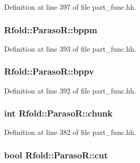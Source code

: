 Definition at line 397 of file part\+\_\+func.\+hh.

\hypertarget{class_rfold_1_1_paraso_r_a0372b87e995aa99226a2e5c0bda44800}{
\subsubsection[{bppm}]{ Rfold\+::\+Paraso\+R\+::bppm}}\label{class_rfold_1_1_paraso_r_a0372b87e995aa99226a2e5c0bda44800}


Definition at line 393 of file part\+\_\+func.\+hh.

\hypertarget{class_rfold_1_1_paraso_r_a34ad7bc233e6711a93c7cb69c8ed9855}{
\subsubsection[{bppv}]{ Rfold\+::\+Paraso\+R\+::bppv}}\label{class_rfold_1_1_paraso_r_a34ad7bc233e6711a93c7cb69c8ed9855}


Definition at line 392 of file part\+\_\+func.\+hh.

\hypertarget{class_rfold_1_1_paraso_r_aafdf04b7ad506cfa1457bfefa3423e31}{
\subsubsection[{chunk}]{\setlength{\rightskip}{0pt plus 5cm}int Rfold\+::\+Paraso\+R\+::chunk}}\label{class_rfold_1_1_paraso_r_aafdf04b7ad506cfa1457bfefa3423e31}


Definition at line 382 of file part\+\_\+func.\+hh.

\hypertarget{class_rfold_1_1_paraso_r_afd1dd1d5fccc77e48fa36bb090be6735}{
\subsubsection[{cut}]{\setlength{\rightskip}{0pt plus 5cm}bool Rfold\+::\+Paraso\+R\+::cut}}\label{class_rfold_1_1_paraso_r_afd1dd1d5fccc77e48fa36bb090be6735}


